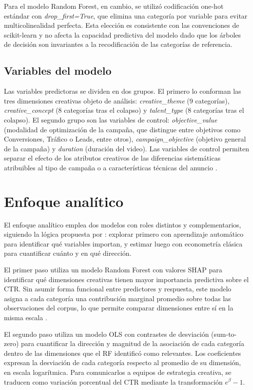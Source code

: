 \documentclass[12pt, a4paper]{report}
\begin{document}
Para el modelo Random Forest, en cambio, se utilizó codificación one-hot estándar con
\textit{drop\_first=True}, que elimina una categoría por variable para evitar multicolinealidad
perfecta. Esta elección es consistente con las convenciones de scikit-learn y no afecta la
capacidad predictiva del modelo dado que los árboles de decisión son invariantes a la
recodificación de las categorías de referencia.

\subsection*{Variables del modelo}

Las variables predictoras se dividen en dos grupos. El primero lo conforman las tres dimensiones
creativas objeto de análisis: \textit{creative\_theme} (9 categorías), \textit{creative\_concept}
(8 categorías tras el colapso) y \textit{talent\_type} (8 categorías tras el colapso). El segundo
grupo son las variables de control: \textit{objective\_value} (modalidad de optimización de la
campaña, que distingue entre objetivos como Conversiones, Tráfico o Leads, entre otros),
\textit{campaign\_objective} (objetivo general de la campaña) y \textit{duration} (duración del
video). Las variables de control permiten separar el efecto de los atributos creativos de las
diferencias sistemáticas atribuibles al tipo de campaña o a características técnicas del anuncio \citep[cap.~2]{cunningham2021}.

\section{Enfoque analítico}

El enfoque analítico emplea dos modelos con roles distintos y complementarios, siguiendo
la lógica propuesta por \citet{mullainathan2017}: explorar primero con aprendizaje
automático para identificar qué variables importan, y estimar luego con econometría
clásica para cuantificar cuánto y en qué dirección.

El primer paso utiliza un modelo Random Forest con valores SHAP para identificar qué
dimensiones creativas tienen mayor importancia predictiva sobre el CTR. Sin asumir forma
funcional entre predictores y respuesta, este modelo asigna a cada categoría una
contribución marginal promedio sobre todas las observaciones del corpus, lo que permite
comparar dimensiones entre sí en la misma escala \citep{lundberg2017, strobl2007}.

El segundo paso utiliza un modelo OLS con contrastes de desviación (sum-to-zero) para
cuantificar la dirección y magnitud de la asociación de cada categoría dentro de las
dimensiones que el RF identificó como relevantes. Los coeficientes expresan la desviación
de cada categoría respecto al promedio de su dimensión, en escala logarítmica. Para
comunicarlos a equipos de estrategia creativa, se traducen como variación porcentual
del CTR mediante la transformación $e^{\beta} - 1$.
\end{document}
